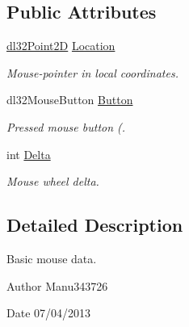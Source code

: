 \subsection*{Public Attributes}
\begin{DoxyCompactItemize}
\item 
\hypertarget{structdl32_mouse_data_a955784ccc5fba59dea64b191ec5ab8b2}{\hyperlink{structdl32_point2_d}{dl32\-Point2\-D} \hyperlink{structdl32_mouse_data_a955784ccc5fba59dea64b191ec5ab8b2}{Location}}\label{structdl32_mouse_data_a955784ccc5fba59dea64b191ec5ab8b2}

\begin{DoxyCompactList}\small\item\em Mouse-\/pointer in local coordinates. \end{DoxyCompactList}\item 
dl32\-Mouse\-Button \hyperlink{structdl32_mouse_data_a58c299b3c00f707d5de338b942e7be21}{Button}
\begin{DoxyCompactList}\small\item\em Pressed mouse button (. \end{DoxyCompactList}\item 
\hypertarget{structdl32_mouse_data_abb8f32314aadbbef2b75aa8145b56c18}{int \hyperlink{structdl32_mouse_data_abb8f32314aadbbef2b75aa8145b56c18}{Delta}}\label{structdl32_mouse_data_abb8f32314aadbbef2b75aa8145b56c18}

\begin{DoxyCompactList}\small\item\em Mouse wheel delta. \end{DoxyCompactList}\end{DoxyCompactItemize}


\subsection{Detailed Description}
Basic mouse data. 

\begin{DoxyAuthor}{Author}
Manu343726 
\end{DoxyAuthor}
\begin{DoxyDate}{Date}
07/04/2013 
\end{DoxyDate}



